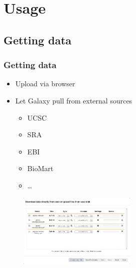 \documentclass{beamer}              %
\begin{document}
\section{Usage}
\subsection{Getting data}
\begin{frame}
    \frametitle{Getting data}
    \begin{itemize}
	    \item Upload via browser
	    \item Let Galaxy pull from external sources
	    \begin{itemize}
	    	\item UCSC
		    \item SRA
		    \item EBI
		    \item BioMart
		    \item \dots
	    \end{itemize}
    \end{itemize}
	\begin{figure}
		\includegraphics[width=0.5\textwidth,left]{figures/101p_03.png}
	\end{figure}
\end{frame}
\end{document}
